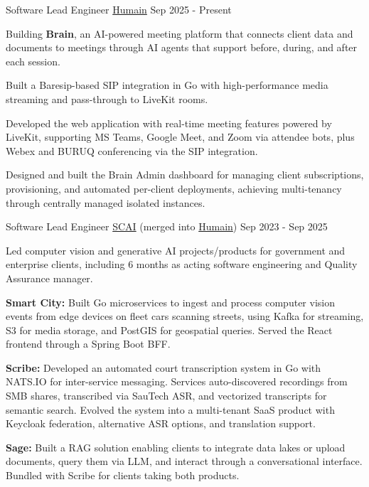 
\begin{cventries}

    \cventry
        {Software Lead Engineer}
        {\href{https://www.humain.com/}{Humain}}
        {Sep 2025 - Present}
        {
            Building \textbf{Brain}, an AI-powered meeting platform that connects client data and documents to meetings through AI agents that support before, during, and after each session.
            \begin{cvitems}
                \item {
                    Built a Baresip-based SIP integration in Go with high-performance media streaming and pass-through to LiveKit rooms.
                }
                \item {
                    Developed the web application with real-time meeting features powered by LiveKit, supporting MS Teams, Google Meet, and Zoom via attendee bots, plus Webex and BURUQ conferencing via the SIP integration.
                }
                \item {
                    Designed and built the Brain Admin dashboard for managing client subscriptions, provisioning, and automated per-client deployments, achieving multi-tenancy through centrally managed isolated instances.
                }
            \end{cvitems}
        }

    \cventry
        {Software Lead Engineer}
        {\href{https://scai.sa/}{SCAI} (merged into \href{https://www.humain.com/}{Humain})}
        {Sep 2023 - Sep 2025}
        {
            Led computer vision and generative AI projects/products for government and enterprise clients, including 6 months as acting software engineering and Quality Assurance manager.
            \begin{cvitems}
                \item {
                    \textbf{Smart City:} Built Go microservices to ingest and process computer vision events from edge devices on fleet cars scanning streets, using Kafka for streaming, S3 for media storage, and PostGIS for geospatial queries. Served the React frontend through a Spring Boot BFF.
                }
                \item {
                    \textbf{Scribe:} Developed an automated court transcription system in Go with NATS.IO for inter-service messaging. Services auto-discovered recordings from SMB shares, transcribed via SauTech ASR, and vectorized transcripts for semantic search. Evolved the system into a multi-tenant SaaS product with Keycloak federation, alternative ASR options, and translation support.
                }
                \item {
                    \textbf{Sage:} Built a RAG solution enabling clients to integrate data lakes or upload documents, query them via LLM, and interact through a conversational interface. Bundled with Scribe for clients taking both products.
                }
            \end{cvitems}
        }


\end{cventries}
